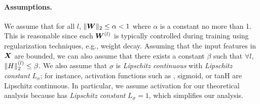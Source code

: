 \paragraph{Assumptions.} We assume that for all $l$, $\| {\bm{W}} \|_{2} \leq \alpha < 1$ where $\alpha$ is a constant no more than 1. This is reasonable since each ${\bm{W}}^{(l)}$ is typically controlled during training using regularization techniques, e.g., weight decay. Assuming that the input features in ${\bm{X}}$ are bounded, we can also assume that there exists a constant $\beta$ such that $\forall l$, $\| H \|_{2}^{(l)} \leq \beta$. We also assume that $\sigma$ is \emph{Lipschitz continuous} with \emph{Lipschitz constant} $L_\sigma$; for instance,  activation functions such as \relu, sigmoid, or tanH are Lipschitz continuous. In particular, we assume \relu activation for our theoretical analysis because \relu has \emph{Lipschitz constant} $L_\sigma = 1$, which simplifies our analysis.

